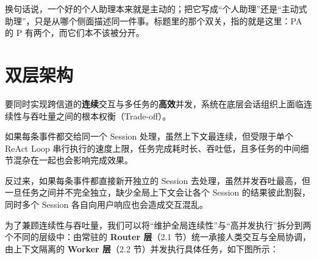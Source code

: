 \documentclass[11pt,a4paper,UTF8,fontset=windows]{ctexart}
\begin{document}
换句话说，一个好的个人助理本来就是主动的；把它写成“个人助理”还是“主动式助理”，只是从哪个侧面描述同一件事。标题里的那个双关，指的就是这里：PA 的 P 有两个，而它们本不该被分开。

\section{双层架构}

要同时实现跨信道的\textbf{连续}交互与多任务的\textbf{高效}并发，系统在底层会话组织上面临连续性与吞吐量之间的根本权衡（Trade-off）。

如果每条事件都交给同一个 Session 处理，虽然上下文最连续，但受限于单个 ReAct Loop 串行执行的速度上限，任务完成耗时长、吞吐低，且多任务的中间细节混杂在一起也会影响完成效果。

反过来，如果每条事件都直接新开独立的 Session 去处理，虽然并发吞吐最高，但一旦任务之间并不完全独立，缺少全局上下文会让各个 Session 的结果彼此割裂，同时多个 Session 各自向用户响应也会造成交互混乱。

为了兼顾连续性与吞吐量，我们可以将“维护全局连续性”与“高并发执行”拆分到两个不同的层级中：由常驻的 \textbf{Router 层}（2.1 节）统一承接人类交互与全局协调，由上下文隔离的 \textbf{Worker 层}（2.2 节）并发执行具体任务，如下图所示：
\end{document}
